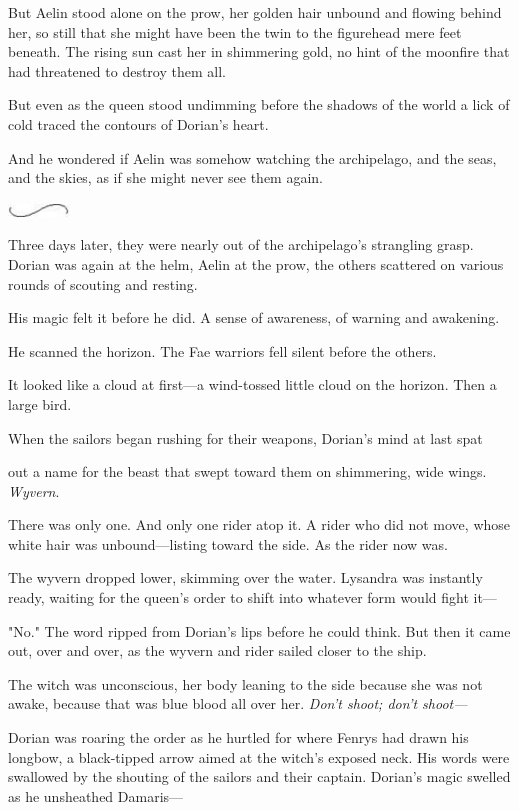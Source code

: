 But Aelin stood alone on the prow, her golden hair unbound and flowing behind her, so still that she might have been the twin to the figurehead mere feet beneath. The rising sun cast her in shimmering gold, no hint of the moonfire that had threatened to destroy them all.

But even as the queen stood undimming before the shadows of the world
 a lick of cold traced the contours of Dorian's heart.

And he wondered if Aelin was somehow watching the archipelago, and the seas, and the skies, as if she might never see them again.

\includegraphics[width=0.65in,height=0.13in]{images/seperator}

Three days later, they were nearly out of the archipelago's strangling grasp. Dorian was again at the helm, Aelin at the prow, the others scattered on various rounds of scouting and resting.

His magic felt it before he did. A sense of awareness, of warning and awakening.

He scanned the horizon. The Fae warriors fell silent before the others.

It looked like a cloud at first---a wind-tossed little cloud on the horizon. Then a large bird.

When the sailors began rushing for their weapons, Dorian's mind at last spat

out a name for the beast that swept toward them on shimmering, wide wings. \emph{Wyvern}.

There was only one. And only one rider atop it. A rider who did not move, whose white hair was unbound---listing toward the side. As the rider now was.

The wyvern dropped lower, skimming over the water. Lysandra was instantly ready, waiting for the queen's order to shift into whatever form would fight it---

"No." The word ripped from Dorian's lips before he could think. But then it came out, over and over, as the wyvern and rider sailed closer to the ship.

The witch was unconscious, her body leaning to the side because she was not awake, because that was blue blood all over her. \emph{Don't shoot;
don't shoot---}

Dorian was roaring the order as he hurtled for where Fenrys had drawn his longbow, a black-tipped arrow aimed at the witch's exposed neck. His words were swallowed by the shouting of the sailors and their captain. Dorian's magic swelled as he unsheathed Damaris---

